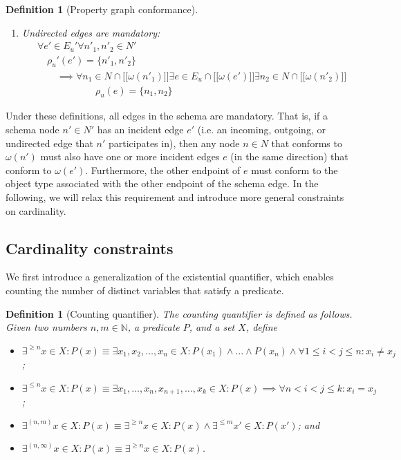 \documentclass[a4paper]{article}
\newtheorem{definition}[theorem]{Definition}
\newcommand{\N}{\mathbb{N}}
\newcommand{\lsem}{\ensuremath{[\![}}
\newcommand{\rsem}{\ensuremath{]\!]}}
\newcommand{\sem}[1]{\ensuremath{\lsem #1 \rsem}}
\begin{document}
\begin{definition}[Property graph conformance]
\begin{enumerate}
    \item Undirected edges are mandatory:
    \begin{align*}
      &\forall e' \in E_u' \forall n'_1, n'_2 \in N'\\
      &\quad\rho_u'(e') = \{n'_1, n'_2\}\\
      &\quad\quad\implies {} \forall n_1 \in N \cap \sem{\omega(n'_1)} \exists e \in E_u \cap \sem{\omega(e')} \exists n_2 \in N \cap \sem{\omega(n'_2)}\\
      &\quad\quad\quad\quad\quad\quad\rho_u(e) = \{n_1, n_2\}
    \end{align*}
  \end{enumerate}
\end{definition}

Under these definitions, all edges in the schema are mandatory. That is, if a schema node $n' \in N'$ has an incident edge $e'$ (i.e. an incoming, outgoing, or undirected edge that $n'$ participates in), then any node $n \in N$ that conforms to $\omega(n')$ must also have one or more incident edges $e$ (in the same direction) that conform to $\omega(e')$. Furthermore, the other endpoint of $e$ must conform to the object type associated with the other endpoint of the schema edge. In the following, we will relax this requirement and introduce more general constraints on cardinality.

\subsection{Cardinality constraints}

We first introduce a generalization of the existential quantifier, which enables counting the number of distinct variables that satisfy a predicate.

\begin{definition}[Counting quantifier]
  The \emph{counting quantifier} is defined as follows. Given two numbers $n, m \in \N$, a predicate $P$, and a set $X$, define
  \begin{itemize}
    \item $\exists^{\geq n} x \in X : P(x) \equiv \exists x_1, x_2, \ldots, x_n \in X : P(x_1) \wedge \ldots \wedge P(x_n) \wedge \forall 1 \leq i < j \leq n : x_i \neq x_j$;
    \item $\exists^{\leq n} x \in X : P(x) \equiv \exists x_1, \ldots, x_n, x_{n+1}, \ldots, x_k \in X : P(x) \implies \forall n < i < j \leq k : x_i = x_j$;
    \item $\exists^{(n, m)} x \in X : P(x) \equiv \exists^{\geq n} x \in X : P(x) \wedge \exists^{\leq m} x' \in X : P(x')$; and
    \item $\exists^{(n, \infty)} x \in X : P(x) \equiv \exists^{\geq n} x \in X : P(x)$.
  \end{itemize}
\end{definition}
\end{document}
